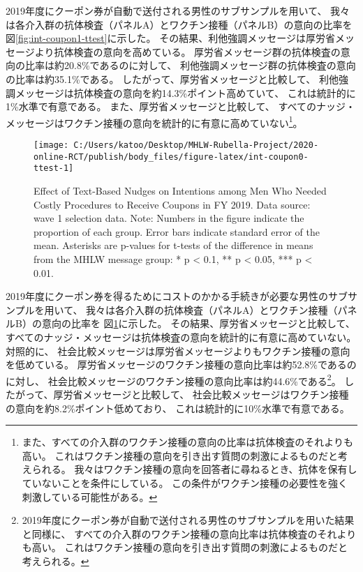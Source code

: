 \documentclass[
  11pt,
  a4paper,
]{article}
\begin{document}
2019年度にクーポン券が自動で送付される男性のサブサンプルを用いて、
我々は各介入群の抗体検査（パネルA）とワクチン接種（パネルB）の意向の比率を
図\ref{fig:int-coupon1-ttest}に示した。
その結果、利他強調メッセージは厚労省メッセージより抗体検査の意向を高めている。
厚労省メッセージ群の抗体検査の意向の比率は約20.8\%であるのに対して、
利他強調メッセージ群の抗体検査の意向の比率は約35.1\%である。
したがって、厚労省メッセージと比較して、
利他強調メッセージは抗体検査の意向を約14.3\%ポイント高めていて、
これは統計的に1\%水準で有意である。
また、厚労省メッセージと比較して、
すべてのナッジ・メッセージはワクチン接種の意向を統計的に有意に高めていない\footnote{また、すべての介入群のワクチン接種の意向の比率は抗体検査のそれよりも高い。
  これはワクチン接種の意向を引き出す質問の刺激によるものだと考えられる。
  我々はワクチン接種の意向を回答者に尋ねるとき、抗体を保有していないことを条件にしている。
  この条件がワクチン接種の必要性を強く刺激している可能性がある。}。

\begin{figure}[t]
\texttt{[image: C:/Users/katoo/Desktop/MHLW-Rubella-Project/2020-online-RCT/publish/body\_files/figure-latex/int-coupon0-ttest-1]} \caption{Effect of Text-Based Nudges on Intentions among Men Who Needed Costly Procedures to Receive Coupons in FY 2019. Data source: wave 1 selection data. Note: Numbers in the figure indicate the proportion of each group. Error bars indicate standard error of the mean. Asterisks are p-values for t-tests of the difference in means from the MHLW message group: * p < 0.1, ** p < 0.05, *** p < 0.01.}\label{fig:int-coupon0-ttest}
\end{figure}

2019年度にクーポン券を得るためにコストのかかる手続きが必要な男性のサブサンプルを用いて、
我々は各介入群の抗体検査（パネルA）とワクチン接種（パネルB）の意向の比率を
図\ref{fig:int-coupon0-ttest}に示した。
その結果、厚労省メッセージと比較して、
すべてのナッジ・メッセージは抗体検査の意向を統計的に有意に高めていない。
対照的に、
社会比較メッセージは厚労省メッセージよりもワクチン接種の意向を低めている。
厚労省メッセージのワクチン接種の意向比率は約52.8\%であるのに対し、
社会比較メッセージのワクチン接種の意向比率は約44.6\%である\footnote{2019年度にクーポン券が自動で送付される男性のサブサンプルを用いた結果と同様に、
  すべての介入群のワクチン接種の意向比率は抗体検査のそれよりも高い。
  これはワクチン接種の意向を引き出す質問の刺激によるものだと考えられる。}。
したがって、厚労省メッセージと比較して、
社会比較メッセージはワクチン接種の意向を約8.2\%ポイント低めており、
これは統計的に10\%水準で有意である。
\end{document}
